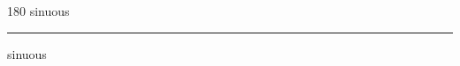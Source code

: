 
\begin{frame}
\begin{center}
\begin{turn}{180}
{\fontsize{2.5cm}{1em}\selectfont sinuous}
\end{turn}
\vspace{1em}\par  
\hrule
\vspace{1em}\par  
{\fontsize{2.5cm}{1em}\selectfont sinuous}
\end{center}
\end{frame}
